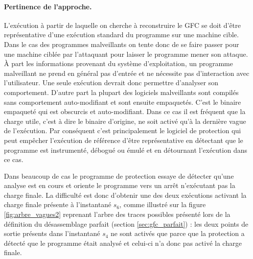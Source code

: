 \paragraph{Pertinence de l'approche.}
L'exécution à partir de laquelle on cherche à reconstruire le GFC se doit d'être représentative d'une exécution standard du programme sur une machine cible.
Dans le cas des programmes malveillants on tente donc de se faire passer pour une machine ciblée par l'attaquant pour laisser le programme mener son attaque. 
À part les informations provenant du système d'exploitation, un programme malveillant ne prend en général pas d'entrée et ne nécessite pas d'interaction avec l'utilisateur. Une seule exécution devrait donc permettre d'analyser son comportement.
D'autre part la plupart des logiciels malveillants sont compilés sans comportement auto-modifiant et sont ensuite empaquetés. C'est le binaire empaqueté qui est obscurcis et auto-modifiant.
Dans ce cas il est fréquent \cite{Calvet2013} que la charge utile, c'est à dire le binaire d'origine, ne soit activé qu'à la dernière vague de l'exécution.
Par conséquent c'est principalement le logiciel de protection qui peut empêcher l'exécution de référence d'être représentative en détectant que le programme est instrumenté, débogué ou émulé et en détournant l'exécution dans ce cas.

Dans beaucoup de cas le programme de protection essaye de détecter qu'une analyse est en cours et oriente le programme vers un arrêt n'exécutant pas la charge finale.
La difficulté est donc d'obtenir une des deux exécutions activant la charge finale présente à l'instantané $s_6$, comme illustré sur la figure \ref{fig:arbre_vagues2} reprenant l'arbre des traces possibles présenté lors de la définition du désassemblage parfait (section \ref{sec:gfc_parfait}) : les deux points de sortie présents dans l'instantané $s_4$ ne sont activés que parce que la protection a détecté que le programme était analysé et celui-ci n'a donc pas activé la charge finale.

